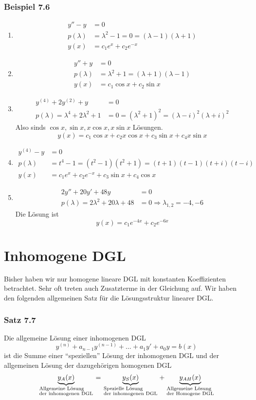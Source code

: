 \subsubsection*{Beispiel 7.6}
\begin{enumerate}
\item \begin{align*}
y''-y&=0\\
p(\lambda)&=\lambda^2-1=0=(\lambda-1)(\lambda+1)\\
y(x)&=c_1e^x+c_2e^{-x}
\end{align*}
\item 
\begin{align*}
y''+y&=0\\
p(\lambda)&=\lambda^2+1=(\lambda+1)(\lambda-1)\\
y(x)&=c_1\cos x+c_2\sin x
\end{align*}
\item 
\begin{align*}
y^{(4)}+2y^{(2)}+y&=0\\
p(\lambda)=\lambda^4+2\lambda^2+1&=0=(\lambda^2+1)^2=(\lambda-i)^2(\lambda+i)^2
\end{align*}
Also sinds $\cos x, \sin x, x\cos x,x\sin x$ Lösungen. \[y(x)=c_1\cos x+c_2 x\cos x+c_3\sin x+c_4 x\sin x\]
\item \begin{align*}
y^{(4)}-y&=0\\
p(\lambda)&=t^4-1=(t^2-1)(t^2+1)=(t+1)(t-1)(t+i)(t-i)\\
y(x)&=c_1e^x+c_2e^{-x}+c_3\sin x+c_4\cos x
\end{align*}
\item \begin{align*}
2y''+20y'+48y&=0\\
p(\lambda)=2\lambda^2 +20\lambda+48&=0\Rightarrow \lambda_{1,2}=-4,-6
\end{align*}
Die Lösung ist \[y(x)=c_1e^{-4x}+c_2e^{-6x}\]
\end{enumerate}
\section{Inhomogene DGL}
Bisher haben wir nur homogene lineare DGL mit konstanten Koeffizienten betrachtet. Sehr oft treten auch Zusatzterme in der Gleichung auf. Wir haben den folgenden allgemeinen Satz für die Lösungsstruktur linearer DGL.
\subsubsection*{Satz 7.7}
Die allgemeine Lösung einer inhomogenen DGL \[y^{(n)}+a_{n-1}y^{(n-1)}+\dots +a_1y'+a_0y=b(x)\] ist die Summe einer ``speziellen'' Lösung der inhomogenen DGL und der allgemeinen Lösung der dazugehörigen homogenen DGL $$\underbrace {{y_A}(x)}_{\scriptstyle{\text{Allgemeine Lösung }}\hfill\atop
\scriptstyle{\text{der inhomogenen DGL}}\hfill} = \underbrace {{y_S}(x)}_{\scriptstyle{\text{Spezielle Lösung }}\hfill\atop
\scriptstyle{\text{der inhomogenen DGL}}\hfill} + \underbrace {{y_{AH}}(x)}_{\scriptstyle{\text{Allgemeine Lösung }}\hfill\atop
\scriptstyle{\text{der Homogene DGL}}\hfill}$$
